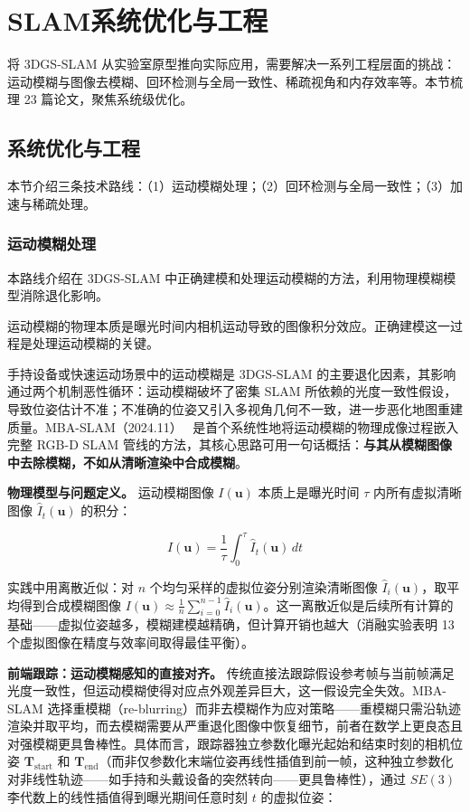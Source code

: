 \section{SLAM系统优化与工程}
\label{sec:15_7}

将 3DGS-SLAM 从实验室原型推向实际应用，需要解决一系列工程层面的挑战：运动模糊与图像去模糊、回环检测与全局一致性、稀疏视角和内存效率等。本节梳理 23 篇论文，聚焦系统级优化。

\subsection{系统优化与工程}
\label{ss:15_7a}

本节介绍三条技术路线：（1）运动模糊处理；（2）回环检测与全局一致性；（3）加速与稀疏处理。

\subsubsection{运动模糊处理}

本路线介绍在 3DGS-SLAM 中正确建模和处理运动模糊的方法，利用物理模糊模型消除退化影响。

运动模糊的物理本质是曝光时间内相机运动导致的图像积分效应。正确建模这一过程是处理运动模糊的关键。

手持设备或快速运动场景中的运动模糊是 3DGS-SLAM 的主要退化因素，其影响通过两个机制恶性循环：运动模糊破坏了密集 SLAM 所依赖的光度一致性假设，导致位姿估计不准；不准确的位姿又引入多视角几何不一致，进一步恶化地图重建质量。MBA-SLAM（2024.11）~\cite{2411_08279} 是首个系统性地将运动模糊的物理成像过程嵌入完整 RGB-D SLAM 管线的方法，其核心思路可用一句话概括：\textbf{与其从模糊图像中去除模糊，不如从清晰渲染中合成模糊}。

\textbf{物理模型与问题定义。}
运动模糊图像 $I(\mathbf{u})$ 本质上是曝光时间 $\tau$ 内所有虚拟清晰图像 $\hat{I}_t(\mathbf{u})$ 的积分：

\begin{equation}
    I(\mathbf{u}) = \frac{1}{\tau}\int_0^{\tau} \hat{I}_t(\mathbf{u}) \, dt
    \label{eq:ch15_blur_formation}
\end{equation}

实践中用离散近似：对 $n$ 个均匀采样的虚拟位姿分别渲染清晰图像 $\hat{I}_i(\mathbf{u})$，取平均得到合成模糊图像 $I(\mathbf{u}) \approx \frac{1}{n}\sum_{i=0}^{n-1} \hat{I}_i(\mathbf{u})$。这一离散近似是后续所有计算的基础——虚拟位姿越多，模糊建模越精确，但计算开销也越大（消融实验表明 13 个虚拟图像在精度与效率间取得最佳平衡）。

\textbf{前端跟踪：运动模糊感知的直接对齐。}
传统直接法跟踪假设参考帧与当前帧满足光度一致性，但运动模糊使得对应点外观差异巨大，这一假设完全失效。MBA-SLAM 选择重模糊（re-blurring）而非去模糊作为应对策略——重模糊只需沿轨迹渲染并取平均，而去模糊需要从严重退化图像中恢复细节，前者在数学上更良态且对强模糊更具鲁棒性。具体而言，跟踪器独立参数化曝光起始和结束时刻的相机位姿 $\mathbf{T}_{\mathrm{start}}$ 和 $\mathbf{T}_{\mathrm{end}}$（而非仅参数化末端位姿再线性插值到前一帧，这种独立参数化对非线性轨迹——如手持和头戴设备的突然转向——更具鲁棒性），通过 $SE(3)$ 李代数上的线性插值得到曝光期间任意时刻 $t$ 的虚拟位姿：

